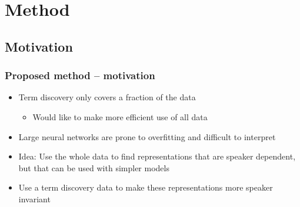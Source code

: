 \documentclass[british]{beamer}
\begin{document}
  \section{Method}
  \subsection{Motivation}
  
  \begin{frame}
    \frametitle{Proposed method -- motivation}
    
    \begin{itemize}
     \item Term discovery only covers a fraction of the data
     \begin{itemize}
      \item Would like to make more efficient use of all data
     \end{itemize}
     \item Large neural networks are prone to overfitting and difficult to interpret
     \item Idea: Use the whole data to find representations that are speaker dependent, but that can be used with simpler models
     \item Use a term discovery data to make these representations more speaker invariant
    \end{itemize}
  \end{frame}
  
\end{document}
